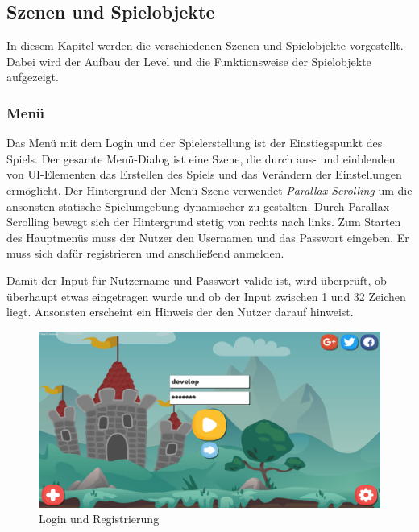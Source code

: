 \subsection{Szenen und Spielobjekte}
\label{subsec:implementierung:umsetzung:realisierung}
In diesem Kapitel werden die verschiedenen Szenen und Spielobjekte vorgestellt. Dabei wird der Aufbau der Level und die Funktionsweise der Spielobjekte aufgezeigt.

\subsubsection{Menü}
\label{subsubsec:implementierung:umsetzung:realisierung:menu}

Das Menü mit dem Login und der Spielerstellung ist der Einstiegspunkt des Spiels. Der gesamte Menü-Dialog ist eine Szene, die durch aus- und einblenden von UI-Elementen das Erstellen des Spiels und das Verändern der Einstellungen ermöglicht. Der Hintergrund der Menü-Szene verwendet \textit{Parallax-Scrolling} um die ansonsten statische Spielumgebung dynamischer zu gestalten. Durch Parallax-Scrolling bewegt sich der Hintergrund stetig von rechts nach links. Zum Starten des Hauptmenüs muss der Nutzer den Usernamen und das Passwort eingeben. Er muss sich dafür registrieren und anschließend anmelden. 

Damit der Input für Nutzername und Passwort valide ist, wird überprüft, ob überhaupt etwas eingetragen wurde und ob der Input zwischen 1 und 32 Zeichen liegt. Ansonsten erscheint ein Hinweis der den Nutzer darauf hinweist.

\begin{figure}[H]
    \begin{center}
      \includegraphics[width=\linewidth]{img/realisierung/Login}
      \caption{Login und Registrierung}
      \label{fig:realisierung:realisierung:login}
    \end{center}
\end{figure}

